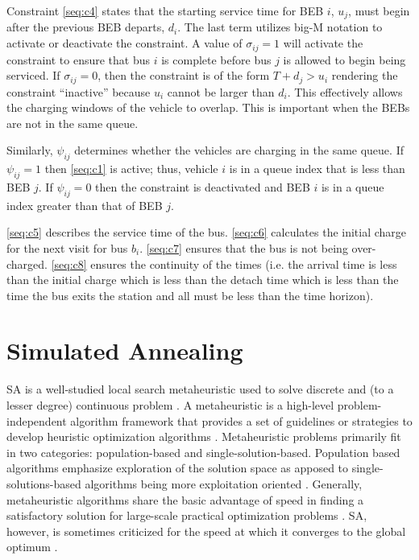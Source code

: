 \documentclass[11pt,a4paper,final]{article}
\begin{document}
Constraint \ref{seq:c4} states that the starting service time for BEB \(i\), \(u_j\), must begin after the previous BEB
departs, \(d_i\). The last term utilizes big-M notation to activate or deactivate the constraint. A value of \(\sigma_{ij} = 1\)
will activate the constraint to ensure that bus \(i\) is complete before bus \(j\) is allowed to begin being serviced. If
\(\sigma_{ij} = 0\), then the constraint is of the form \(T + d_j > u_i\) rendering the constraint ``inactive'' because \(u_i\)
cannot be larger than \(d_i\). This effectively allows the charging windows of the vehicle to overlap. This is important when the BEBs are not in the same queue.

Similarly, \(\psi_{ij}\) determines whether the vehicles are charging in the same queue. If \(\psi_{ij} = 1\) then \eqref{seq:c1}
is active; thus, vehicle \(i\) is in a queue index that is less than BEB \(j\). If \(\psi_{ij} = 0\) then the constraint is
deactivated and BEB \(i\) is in a queue index greater than that of BEB \(j\).

 \ref{seq:c5} describes the service time of the bus. \ref{seq:c6} calculates the initial charge for the next visit for
bus \(b_i\). \ref{seq:c7} ensures that the bus is not being over-charged. \ref{seq:c8} ensures the continuity of the times
(i.e. the arrival time is less than the initial charge which is less than the detach time which is less than the time
the bus exits the station and all must be less than the time horizon).
\section{Simulated Annealing}
\label{sec:simulated-annealing}
SA is a well-studied local search metaheuristic used to solve discrete and (to a lesser degree) continuous problem
\cite{gendreau-2018-handb-metah}. A metaheuristic is a high-level problem-independent algorithm framework that provides
a set of guidelines or strategies to develop heuristic optimization algorithms \cite{radosavljevic-2018-metah-optim}.
Metaheuristic problems primarily fit in two categories: population-based and single-solution-based. Population based
algorithms emphasize exploration of the solution space as apposed to single-solutions-based algorithms being more
exploitation oriented \cite{radosavljevic-2018-metah-optim}. Generally, metaheuristic algorithms share the basic
advantage of speed in finding a satisfactory solution for large-scale practical optimization problems
\cite{radosavljevic-2018-metah-optim}. SA, however, is sometimes criticized for the speed at which it converges to the
global optimum \cite{gendreau-2018-handb-metah,henderson-1989-theor-pract}.
\end{document}
